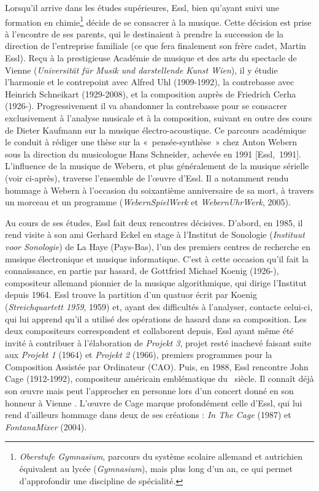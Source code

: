 \documentclass[a4paper,12pt]{article}
\newcommand{\guill}[1]{«~#1~»}
\newcommand{\cicite}[1]{{\footnotesize[#1]}}
\begin{document}
Lorsqu'il arrive dans les études supérieures, Essl, bien qu'ayant suivi une formation en chimie\footnote{\emph{Oberstufe Gymnasium}, parcours du système scolaire allemand et autrichien équivalent au lycée (\emph{Gymnasium}), mais plus long d'un an, ce qui permet d'approfondir une discipline de spécialité.} décide de se consacrer à la musique. Cette décision est prise à l'encontre de ses parents, qui le destinaient à prendre la succession de la direction de l'entreprise familiale (ce que fera finalement son frère cadet, Martin Essl). Reçu à la prestigieuse Académie de musique et des arts du spectacle de Vienne (\emph{Universität für Musik und darstellende Kunst Wien}), il y étudie l'harmonie et le contrepoint avec Alfred Uhl (1909-1992), la contrebasse avec Heinrich Schneikart (1929-2008), et la composition auprès de Friedrich Cerha (1926-). Progressivement il va abandonner la contrebasse pour se consacrer exclusivement à l'analyse musicale et à la composition, suivant en outre des cours de Dieter Kaufmann sur la musique électro-acoustique. 	Ce parcours académique le conduit à rédiger une thèse sur la \guill{pensée-synthèse} chez Anton Webern sous la direction du musicologue Hans Schneider, achevée en 1991 \cicite{Essl,~1991}. L'influence de la musique de Webern, et plus généralement de la musique sérielle (voir ci-après), traverse l'ensemble de l'œuvre d'Essl. Il a notamment rendu hommage à Webern à l'occasion du soixantième anniversaire de sa mort, à travers un morceau et un programme (\emph{WebernSpielWerk} et \emph{WebernUhrWerk}, 2005).

Au cours de ses études, Essl fait deux rencontres décisives. D'abord, en 1985, il rend visite à son ami Gerhard Eckel en stage à l'Institut de Sonologie (\emph{Instituut voor Sonologie}) de La Haye (Pays-Bas), l'un des premiers centres de recherche en musique électronique et musique informatique. C'est à cette occasion qu'il fait la connaissance, en partie par hasard, de Gottfried Michael Koenig (1926-), compositeur allemand pionnier de la musique algorithmique, qui dirige l'Institut depuis 1964. Essl trouve la partition d'un quatuor écrit par Koenig (\emph{Streichquartett 1959}, 1959) et, ayant des difficultés à l'analyser, contacte celui-ci, qui lui apprend qu'il a utilisé des opérations de hasard dans sa composition. Les deux compositeurs correspondent et collaborent depuis, Essl ayant même été invité à contribuer à l'élaboration de \emph{Projekt 3}, projet resté inachevé faisant suite aux \emph{Projekt 1} (1964) et \emph{Projekt 2} (1966), premiers programmes pour la Composition Assistée par Ordinateur (CAO). Puis, en 1988, Essl rencontre John Cage (1912-1992), compositeur américain emblématique du \XXe~siècle. Il connaît déjà son œuvre mais peut l'approcher en personne lors d'un concert donné en son honneur à Vienne . L'œuvre de Cage marque profondément celle d'Essl, qui lui rend d'ailleurs hommage dans deux de ses créations : \emph{In The Cage} (1987) et \emph{FontanaMixer} (2004).
\end{document}
